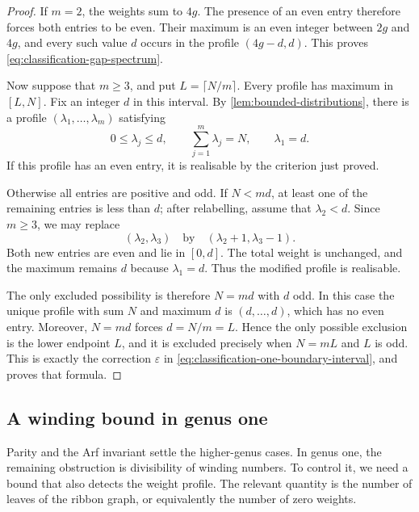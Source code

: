 \documentclass[11pt]{amsart}
\theoremstyle{definition}
\theoremstyle{plain}
\theoremstyle{definition}
\theoremstyle{definition}
\begin{document}
\begin{proof}
If $m=2$, the weights sum to $4g$.
The presence of an even entry therefore forces both
entries to be even.
Their maximum is an even integer between $2g$ and
$4g$, and every such value $d$ occurs in the profile
$(4g-d,d)$.
This proves \eqref{eq:classification-gap-spectrum}.

Now suppose that $m\geq3$, and put $L=\lceil N/m\rceil$.
Every profile has maximum in $[L,N]$.
Fix an integer $d$ in this interval.
By \cref{lem:bounded-distributions}, there is a profile
$(\lambda_1,\ldots,\lambda_m)$ satisfying
\[
 0\leq\lambda_j\leq d,
 \qquad
 \sum_{j=1}^m\lambda_j=N,
 \qquad
 \lambda_1=d.
\]
If this profile has an even entry, it is realisable
by the criterion just proved.

Otherwise all entries are positive and odd.
If $N<md$, at least one of the remaining entries is
less than $d$; after relabelling, assume that
$\lambda_2<d$.
Since $m\geq3$, we may replace
\[
 (\lambda_2,\lambda_3)
 \quad\text{by}\quad
 (\lambda_2+1,\lambda_3-1).
\]
Both new entries are even and lie in $[0,d]$.
The total weight is unchanged, and the maximum remains
$d$ because $\lambda_1=d$.
Thus the modified profile is realisable.

The only excluded possibility is therefore
$N=md$ with $d$ odd.
In this case the unique profile with sum $N$ and
maximum $d$ is $(d,\ldots,d)$, which has no even entry.
Moreover, $N=md$ forces $d=N/m=L$.
Hence the only possible exclusion is the lower
endpoint $L$, and it is excluded precisely when
$N=mL$ and $L$ is odd.
This is exactly the correction $\varepsilon$ in
\eqref{eq:classification-one-boundary-interval},
and proves that formula.
\end{proof}

\subsection{A winding bound in genus one}
\label{subsec:classification-winding-bound}

Parity and the Arf invariant settle the higher-genus cases.  In genus
one, the remaining obstruction is divisibility of winding numbers.
To control it, we need a bound that also detects the weight profile.  The relevant quantity is the number of
leaves of the ribbon graph, or equivalently the number of zero weights.
\end{document}
